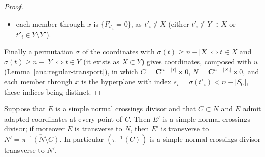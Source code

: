 \begin{proof}
\begin{itemize}
of \(F\) on \(B\);
\item each member through \(x\) is \(\{F_{t'_i}=0\}\), as \(t'_i\notin X\) (either \(t'_i\notin Y\supset X\) or \(t'_i\in Y\setminus Y'\)).
\end{itemize}
Finally a permutation \(\sigma\) of the coordinates with \(\sigma(t)\ge n-|X|\iff t\in X\) and \(\sigma(t)\ge n-|Y|\iff t\in Y\) (it exists as
\(X\subset Y\)) gives coordinates, composed with \(u\) (Lemma~\ref{ana:regular-transport}), in which \(C=\mathbf C^{n-|Y|}\times0\),
\(N=\mathbf C^{n-|S_0|}\times0\), and each member through \(x\) is the hyperplane with index \(s_i=\sigma(t'_i)<n-|S_0|\), these indices being distinct.
\end{proof}

\begin{theorem}
\label{bcalc:snc-transform}
\leanok
Suppose that \(E\) is a simple normal crossings divisor and that \(C\subset N\) and \(E\) admit adapted coordinates at every point of \(C\). Then
\(E'\) is a simple normal crossings divisor; if moreover \(E\) is transverse to \(N\), then \(E'\) is transverse to
\(N'=\overline{\pi^{-1}(N\setminus C)}\). In particular \((\pi^{-1}(C))\) is a simple normal crossings divisor transverse to \(N'\).
\end{theorem}
